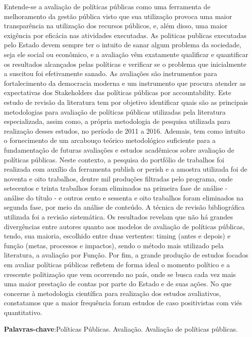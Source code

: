 \documentclass[article,12pt,onesidea,4paper,english,brazil]{abntex2}
\begin{document}
	\noindent Entende-se a avaliação de políticas públicas como uma ferramenta de melhoramento
	da gestão pública visto que sua utilização provoca uma maior transparência na
	utilização dos recursos públicos, e, além disso, uma maior exigência por eficácia nas
	atividades executadas. As politicas publicas executadas pelo Estado devem sempre
	ter o intuito de sanar algum problema da sociedade, seja ele social ou econômico, e a
	avaliação vêm exatamente qualificar e quantificar os resultados alcançados pelas
	políticas e verificar se o problema que inicialmente a suscitou foi efetivamente sanado.
	As avaliações são instrumentos para fortalecimento da democracia moderna e um
	instrumento que procura atender as expectativas dos Stakeholders das políticas
	públicas por accountability. Este estudo de revisão da literatura tem por objetivo
	identificar quais são as principais metodologias para avaliação de políticas públicas
	utilizadas pela literatura especializada, assim como, a própria metodologia de
	pesquisa utilizada para realização desses estudos, no período de 2011 a 2016.
	Ademais, tem como intuito o fornecimento de um arcabouço teórico metodológico
	suficiente para a fundamentação de futuras avaliações e estudos acadêmicos sobre
	avaliação de políticas públicas. Neste contexto, a pesquisa do portfólio de trabalhos
	foi realizada com auxílio da ferramenta publish or perish e a amostra utilizada foi de
	noventa e oito trabalhos, dentre mil produções filtradas pelo programa, onde
	setecentos e trinta trabalhos foram eliminados na primeira fase de análise - análise do
	título - e outros cento e sessenta e oito trabalhos foram eliminados na segunda fase,
	por meio da análise de conteúdo. A técnica de revisão bibliográfica utilizada foi a
	revisão sistemática. Os resultados revelam que não há grandes divergências entre
	autores quanto aos modelos de avaliação de políticas públicas, tendo, sua maioria,
	escolhido entre duas vertentes: timing (antes e depois) e função (metas, processos e
	impactos), sendo o método mais utilizado pela literatura, a avaliação por Função. Por
	fim, a grande produção de estudos focados em avaliar políticas públicas refletem de
	forma ideal o momento político e a crescente politização que vem ocorrendo no país,
	onde se busca cada vez mais uma maior prestação de contas por parte do Estado e
	de suas ações. No que concerne à metodologia científica para realização dos estudos avaliativos, constatamos que a maior frequência foram estudos de caso positivistas
	com viés quantitativo.
	
	\vspace{\onelineskip}
	
	\noindent 
	\textbf{Palavras-chave}:Políticas Públicas. Avaliação. Avaliação de políticas públicas.

	
\end{document}
